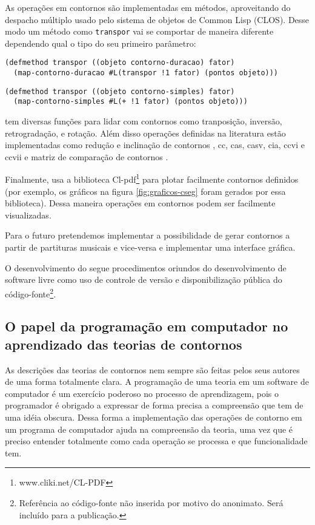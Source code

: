 As operações em contornos são implementadas em métodos, aproveitando
do despacho múltiplo usado pelo sistema de objetos de Common Lisp
(CLOS). Desse modo um método como \texttt{transpor} vai se comportar
de maneira diferente dependendo qual o tipo do seu primeiro parâmetro:

\begin{verbatim}
(defmethod transpor ((objeto contorno-duracao) fator)
  (map-contorno-duracao #L(transpor !1 fator) (pontos objeto)))
\end{verbatim}

\begin{verbatim}
(defmethod transpor ((objeto contorno-simples) fator)
  (map-contorno-simples #L(+ !1 fator) (pontos objeto)))
\end{verbatim}

\goiaba{} tem diversas funções para lidar com contornos como
tranposição, inversão, retrogradação, e rotação. Além disso operações
definidas na literatura estão implementadas como redução e inclinação
de contornos \cite{adams76:melodic}, cc, cas, casv, cia, ccvi e ccvii
\cite{friedmann85:methodology} e matriz de comparação de contornos
\cite{morris93:directions}. 

Finalmente, \goiaba{} usa a biblioteca
Cl-pdf\footnote{www.cliki.net/CL-PDF} para plotar facilmente contornos
definidos (por exemplo, os gráficos na figura \ref{fig:graficos-cseg}
foram gerados por essa biblioteca). Dessa maneira operações em
contornos podem ser facilmente visualizadas.

Para o futuro pretendemos implementar a possibilidade de gerar
contornos a partir de partituras musicais e vice-versa e implementar
uma interface gráfica.

O desenvolvimento do \goiaba{} segue procedimentos oriundos do
desenvolvimento de software livre como uso de controle de versão e
disponibilização pública do código-fonte\footnote{Referência ao
  código-fonte não inserida por motivo do anonimato. Será incluído
  para a publicação.}.

\subsection{O papel da programação em computador no aprendizado das
  teorias de contornos}
\label{sec:progr-para-compr}

As descrições das teorias de contornos nem sempre são feitas pelos
seus autores de uma forma totalmente clara. A programação de uma
teoria em um software de computador é um exercício poderoso no
processo de aprendizagem, pois o programador é obrigado a expressar de
forma precisa a compreensão que tem de uma idéia obscura. Dessa forma
a implementação das operações de contorno em um programa de computador
ajuda na compreensão da teoria, uma vez que é preciso entender
totalmente como cada operação se processa e que funcionalidade tem.

